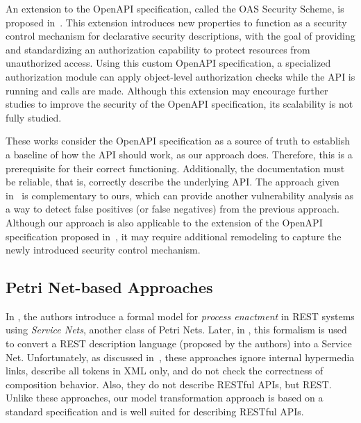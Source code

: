 An extension to the OpenAPI specification, called the OAS Security Scheme, is proposed in~\cite{haddad2022openapi}. This extension introduces new properties to function as a security control mechanism for declarative security descriptions, with the goal of providing and standardizing an authorization capability to protect resources from unauthorized access. Using this custom OpenAPI specification, a specialized authorization module can apply object-level authorization checks while the API is running and calls are made. Although this extension may encourage further studies to improve the security of the OpenAPI specification, its scalability is not fully studied.



These works consider the OpenAPI specification as a source of truth to establish a baseline of how the API should work, as our approach does. Therefore, this is a prerequisite for their correct functioning. Additionally, the documentation must be reliable, that is, correctly describe the underlying API. The approach given in~\cite{DBLP:journals/corr/abs-2201-10833} is complementary to ours, which can provide another vulnerability analysis as a way to detect false positives (or false negatives) from the previous approach. Although our approach is also applicable to the extension of the OpenAPI specification proposed in~\cite{haddad2022openapi}, it may require additional remodeling to capture the newly introduced security control mechanism.


\subsection{Petri Net-based Approaches}

In \cite{decker2008restful}, the authors introduce a formal model for \textit{process enactment} in REST systems using \textit{Service Nets}, another class of  Petri Nets. Later, in \cite{alarcon2010hypermedia}, this formalism is used to convert a REST description language (proposed by the authors) into a Service Net.
Unfortunately, as discussed in~\cite{kallab2017using},  these  approaches  ignore  internal  hypermedia links,  describe  all  tokens  in  XML  only, and do  not  check  the  correctness  of composition  behavior. Also, they do not describe RESTful APIs, but REST. Unlike these approaches, our model transformation approach is based on a standard specification and is well suited for describing RESTful APIs.

